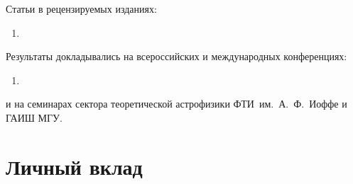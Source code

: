 Статьи в рецензируемых изданиях:
\begin{enumerate}
\item %


\end{enumerate}

Результаты докладывались на всероссийских и международных конференциях: 
\begin{enumerate}
\item 
\end{enumerate}
и на семинарах сектора теоретической астрофизики ФТИ~им.~А.~Ф.~Иоффе и ГАИШ МГУ.

\section*{Личный вклад}




  

\clearpage